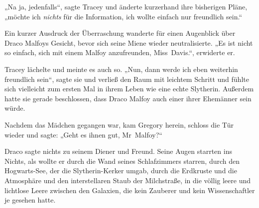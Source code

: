 „Na ja, jedenfalls“, sagte Tracey und änderte kurzerhand ihre bisherigen Pläne, „möchte ich \emph{nichts} für die Information, ich wollte einfach nur freundlich sein.“

Ein kurzer Ausdruck der Überraschung wanderte für einen Augenblick über Draco Malfoys Gesicht, bevor sich seine Miene wieder neutralisierte.
„Es ist nicht so einfach, sich mit einem Malfoy anzufreunden, Miss~Davis.“, erwiderte er.

Tracey lächelte und meinte es auch so.
„Nun, dann werde ich eben weiterhin freundlich sein“, sagte sie und verließ den Raum mit leichtem Schritt und fühlte sich vielleicht zum ersten Mal in ihrem Leben wie eine echte Slytherin. Außerdem hatte sie gerade beschlossen, dass Draco Malfoy auch einer ihrer Ehemänner sein würde.

\later

Nachdem das Mädchen gegangen war, kam Gregory herein, schloss die Tür wieder und sagte:
„Geht es ihnen gut, Mr~Malfoy?“

Draco sagte nichts zu seinem Diener und Freund. Seine Augen starrten ins Nichts, als wollte er durch die Wand seines Schlafzimmers starren, durch den Hogwarts-See, der die Slytherin-Kerker umgab, durch die Erdkruste und die Atmosphäre und den interstellaren Staub der Milchstraße, in die völlig leere und lichtlose Leere zwischen den Galaxien, die kein Zauberer und kein Wissenschaftler je gesehen hatte.

